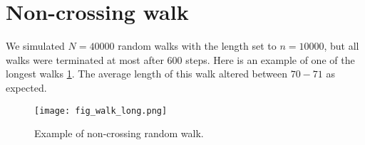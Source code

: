 \documentclass[11pt]{scrartcl} %
\begin{document}
\section{Non-crossing walk}

We simulated $N = 40000$ random walks with the length set to $n = 10000$, but all walks were terminated at most after $600$ steps. Here is an example of one of the longest walks \ref{fig:non-crossing}. The average length of this walk altered between $70-71$ as expected.

\begin{figure}[h] 
	\centering
	\texttt{[image: fig\_walk\_long.png]} 
	\caption{Example of non-crossing random walk.}
	\label{fig:non-crossing}
\end{figure}
\end{document}
